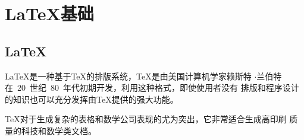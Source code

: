 \chapter{\LaTeX{}基础}
\section{\LaTeX}

\LaTeX{}是一种基于\TeX{}的排版系统，\TeX{}是由美国计算机学家赖斯特
$\cdot$兰伯特在~20~世纪~80~年代初期开发，利用这种格式，即使使用者没有
排版和程序设计的知识也可以充分发挥由\TeX{}提供的强大功能。

\TeX{}对于生成复杂的表格和数学公司表现的尤为突出，它非常适合生成高印刷
质量的科技和数学类文档。
